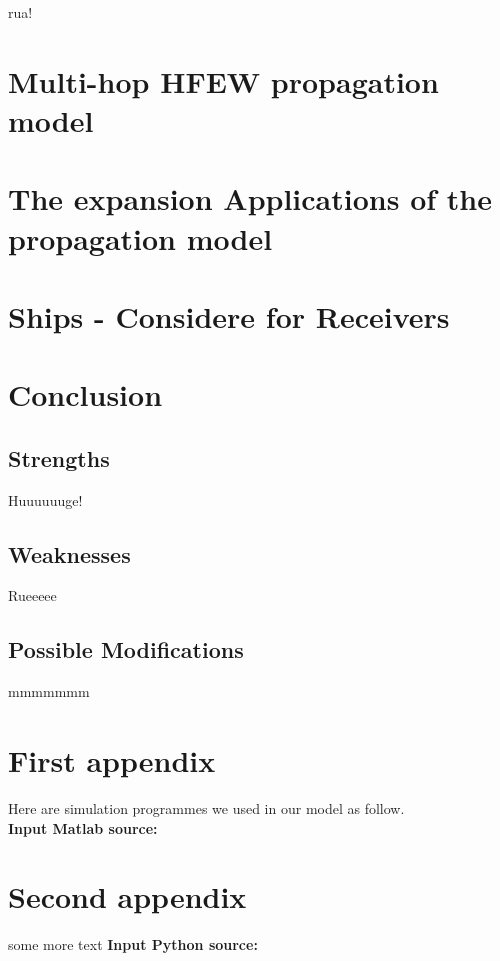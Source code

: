 \documentclass{mcmthesis}
\begin{document}
rua!~~~~

\section{Multi-hop HFEW propagation model}

\section{The expansion Applications of the propagation model}

\section{Ships - Considere for Receivers}

\section{Conclusion}
  \subsection{Strengths}
    Huuuuuuge!
  \subsection{Weaknesses}
    Rueeeee
  \subsection{Possible Modifications}
    mmmmmmm


\newpage
%
%




\newpage
\begin{appendices}

  \section{First appendix}

    Here are simulation programmes we used in our model as follow.\\

    \textbf{\textcolor[rgb]{0.98,0.00,0.00}{Input Matlab source:}}


  \section{Second appendix}

    some more text \textcolor[rgb]{0.98,0.00,0.00}{\textbf{Input Python source:}}


\end{appendices}
\end{document}
